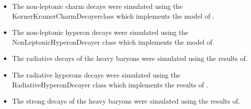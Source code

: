 \documentclass{article}
\begin{document}
\begin{itemize}
\item The non-leptonic charm decays were simulated using the KornerKramerCharmDecayerclass which implements the model of \cite{Korner:1992wi}.
\item The non-leptonic hyperon decays were simulated using the NonLeptonicHyperonDecayer class which implements the model of\cite{Borasoy:1999md}
\item The radiative decays of the heavy baryons were simulated using the results of\cite{Ivanov:1999bk,Ivanov:1998wj}.
\item The radiative hyperons decays were simulated using the RadiativeHyperonDecayer class which implements the results of \cite{Borasoy:1999nt}.
\item The strong decays of the heavy baryons were simulated using the results of\cite{Ivanov:1999bk}.
\end{itemize}
\end{document}
